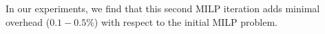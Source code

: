 In our experiments, we find that this second MILP iteration adds
minimal overhead ($0.1-0.5\%$) with respect to the initial MILP
problem.



% 
% 
% 

